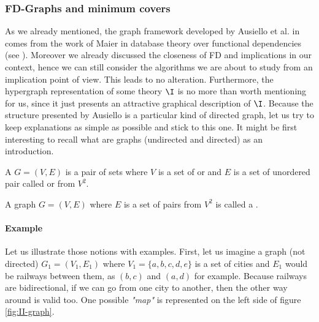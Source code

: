 \subsubsection{FD-Graphs and minimum covers}

As we already mentioned, the graph framework developed by Ausiello et al. in
\cite{ausiello_graph_1983, ausiello_minimal_1986} comes from the work of Maier
in database theory over functional dependencies (see \cite{maier_theory_1983}).
Moreover we already discussed the closeness of FD and implications in our 
context, hence we can still consider the algorithms we are about to study from
an implication point of view. This leads to no alteration. Furthermore, the
hypergraph representation of some theory $\I$ is no more than worth mentioning
for us, since it just presents an attractive graphical description of $\I$.
Because the structure presented by Ausiello is a particular kind of directed
graph, let us try to keep explanations as simple as possible and stick to this
one. It might be first interesting to recall what are graphs (undirected and 
directed) as an introduction.

\begin{definition} A  $G = (V, E)$ is a pair
of sets where $V$ is a set of  or  and $E$ is
a set of unordered pair called  or  from $V^2$.
\end{definition}

\begin{definition} A graph $G = (V, E)$ where $E$ is
a set of  pairs from $V^2$ is called a .	
\end{definition}

\paragraph{Example} Let us illustrate those notions with examples. First, let us
imagine a graph (not directed) $G_1 = (V_1, E_1)$ where $V_1 = \{
a, b, c, d, e\}$ is a set of cities and
$E_1$ would be railways between them, as $(b, c)$ and $(a, d)$ for example. 
Because railways are bidirectional, if we can go from one city to another, then 
the other way around is valid too. One possible \textit{"map"} is represented 
on the left side of figure \ref{fig:II-graph}.

\begin{figure}[ht]
	
\end{figure}

